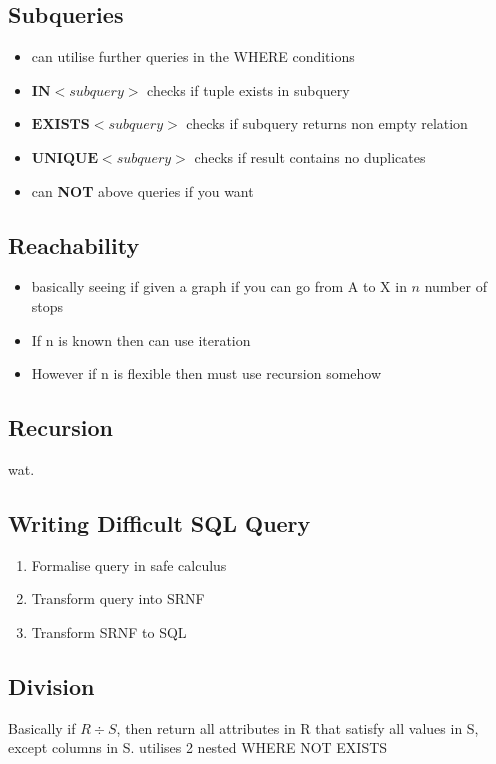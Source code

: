 \documentclass{article}
\begin{document}
	\subsection{Subqueries}
		\begin{itemize}
			\item can utilise further queries in the WHERE conditions
			\item $\textbf{IN} <subquery>$ checks if tuple exists in subquery
			\item $\textbf{EXISTS} <subquery>$ checks if subquery returns non empty relation
			\item $\textbf{UNIQUE} <subquery>$ checks if result contains no duplicates
			\item can \textbf{NOT} above queries if you want
		\end{itemize}

	\subsection{Reachability}
		\begin{itemize}
			\item basically seeing if given a graph if you can go from A to X in $n$ number of stops
			\item If n is known then can use iteration
			\item However if n is flexible then must use recursion somehow
		\end{itemize}

	\subsection{Recursion}
		wat.

	\subsection{Writing Difficult SQL Query}
		\begin{enumerate}
			\item Formalise query in safe calculus
			\item Transform query into SRNF
			\item Transform SRNF to SQL
		\end{enumerate}

	\subsection{Division}
		Basically if $R \div S$, then return all attributes in R that satisfy all values in S, except columns in S.
		utilises 2 nested WHERE NOT EXISTS
\end{document}
